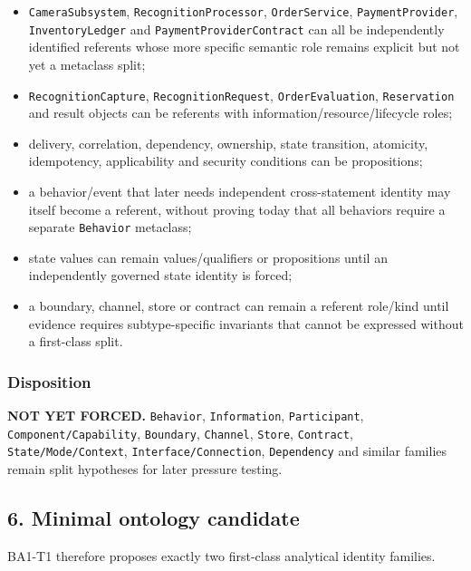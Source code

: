 \documentclass[
]{article}
\providecommand{\tightlist}{%
  \setlength{\itemsep}{0pt}\setlength{\parskip}{0pt}}
\begin{document}
\begin{itemize}
\tightlist
\item
  \texttt{CameraSubsystem}, \texttt{RecognitionProcessor},
  \texttt{OrderService}, \texttt{PaymentProvider},
  \texttt{InventoryLedger} and \texttt{PaymentProviderContract} can all
  be independently identified referents whose more specific semantic
  role remains explicit but not yet a metaclass split;
\item
  \texttt{RecognitionCapture}, \texttt{RecognitionRequest},
  \texttt{OrderEvaluation}, \texttt{Reservation} and result objects can
  be referents with information/resource/lifecycle roles;
\item
  delivery, correlation, dependency, ownership, state transition,
  atomicity, idempotency, applicability and security conditions can be
  propositions;
\item
  a behavior/event that later needs independent cross-statement identity
  may itself become a referent, without proving today that all behaviors
  require a separate \texttt{Behavior} metaclass;
\item
  state values can remain values/qualifiers or propositions until an
  independently governed state identity is forced;
\item
  a boundary, channel, store or contract can remain a referent role/kind
  until evidence requires subtype-specific invariants that cannot be
  expressed without a first-class split.
\end{itemize}

\subsubsection{Disposition}\label{disposition-1}

\textbf{NOT YET FORCED.} \texttt{Behavior}, \texttt{Information},
\texttt{Participant}, \texttt{Component/Capability}, \texttt{Boundary},
\texttt{Channel}, \texttt{Store}, \texttt{Contract},
\texttt{State/Mode/Context}, \texttt{Interface/Connection},
\texttt{Dependency} and similar families remain split hypotheses for
later pressure testing.

\subsection{6. Minimal ontology
candidate}\label{6-minimal-ontology-candidate}

BA1-T1 therefore proposes exactly two first-class analytical identity
families.
\end{document}
